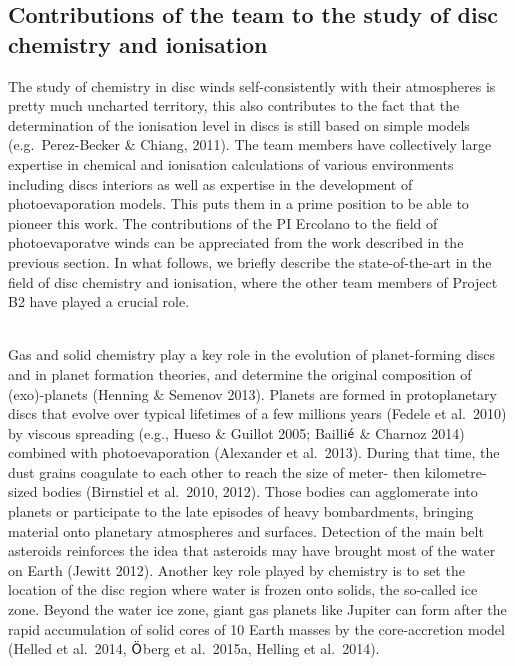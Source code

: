 \documentclass[10pt,fleqn,twoside]{article}
\begin{document}
\subsection{Contributions of the team to the study of disc chemistry and ionisation}
The study of chemistry in disc winds self-consistently with their
atmospheres is pretty much uncharted territory, this also contributes
to the fact that the determination of the ionisation level in discs is
still based on simple models (e.g.\ Perez-Becker \& Chiang, 2011). The
team members have collectively large expertise in chemical and ionisation
calculations of various environments including discs interiors as well
as expertise in the development of photoevaporation models. This puts
them in a prime position to be able to pioneer this work. The
contributions of the PI Ercolano to the field of photoevaporatve winds
can be appreciated from the work described in the previous section. In what
follows, we briefly describe the state-of-the-art in the field of disc
chemistry and ionisation, where the other team members of Project B2 have played
a crucial role.  

\vspace{0.5em}\\
Gas and solid chemistry play a key role in the evolution of planet-forming discs and in planet formation theories, and determine the original composition of (exo)-planets (Henning \& Semenov 2013).  Planets are formed in protoplanetary discs that evolve over typical lifetimes of a few millions years (Fedele et al.\ 2010) by viscous spreading (e.g., Hueso \& Guillot 2005; Bailli$\acute{\textsf e}$ \& Charnoz 2014) combined with photoevaporation (Alexander et al.\ 2013). During that time, the dust grains coagulate to each other to reach the size of meter- then kilometre- sized bodies (Birnstiel et al.\ 2010, 2012). Those bodies can agglomerate into planets or participate to the late episodes of heavy bombardments, bringing material onto planetary atmospheres and surfaces. Detection of the main belt asteroids reinforces the idea that asteroids may have brought most of the water on Earth (Jewitt 2012). Another key role played by chemistry is to set the location of the disc region where water is frozen onto solids, the so-called ice zone. Beyond the water ice zone, giant gas planets like Jupiter can form after the rapid accumulation of solid cores of 10 Earth masses by the core-accretion model (Helled et al.\ 2014, $\ddot{\textsf O}$berg et al.\ 2015a, Helling et al.\ 2014).
\end{document}
